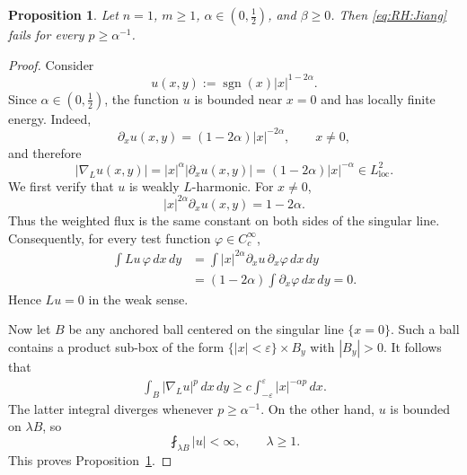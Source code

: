 \documentclass[12pt]{amsart}
\newtheorem{proposition}[theorem]{Proposition}
\begin{document}
\begin{proposition}\label{prop_RH_failure_n1}
Let $n=1$, $m\ge 1$, $\alpha\in (0,\frac{1}{2})$, and $\beta\ge 0$. Then \eqref{eq:RH:Jiang} fails for every $p\ge \alpha^{-1}$.
\end{proposition}

\begin{proof}
Consider
\begin{equation}\label{eq_counterexample_function}
    u(x,y):=\operatorname{sgn}(x)|x|^{1-2\alpha}.
\end{equation}
Since $\alpha \in (0,\frac{1}{2})$, the function $u$ is bounded near $x=0$ and has locally finite energy. Indeed,
\begin{equation*}
\partial_xu(x,y) = (1-2\alpha)|x|^{-2\alpha}, \qquad x\neq0,
\end{equation*}
and therefore
\begin{equation*}
|\nabla_Lu(x,y)| = |x|^\alpha |\partial_x u(x,y)| = (1-2\alpha)|x|^{-\alpha} \in L^2_{\mathrm{loc}}.
\end{equation*}
We first verify that $u$ is weakly $L$-harmonic. For $x\neq0$,
\begin{equation*}
    |x|^{2\alpha}\partial_xu(x,y)
    =
    1-2\alpha.
\end{equation*}
Thus the weighted flux is the same constant on both sides of the singular line. Consequently, for every test function $\varphi\in C_c^\infty$,
\begin{align*}
\int L u \, \varphi \, dx\,dy &= \int |x|^{2\alpha} \partial_x u \, \partial_x \varphi \, dx\,dy\\
&= (1-2\alpha)\int \partial_x\varphi \, dx\,dy = 0.
\end{align*}
Hence $Lu=0$ in the weak sense.

Now let $B$ be any anchored ball centered on the singular line $\{x=0\}$. Such a ball contains a product sub-box of the form $\{|x|<\varepsilon\}\times B_y$ with $|B_y|>0$. It follows that
\begin{align*}
\int_B|\nabla_Lu|^p \, dx\,dy \ge c\int_{-\varepsilon}^{\varepsilon}|x|^{-\alpha p} \, dx.
\end{align*}
The latter integral diverges whenever $p\ge \alpha^{-1}$. On the other hand, $u$ is bounded on $\lambda B$, so
\begin{equation*}
\fint_{\lambda B}|u|<\infty, \qquad \lambda \ge 1.
\end{equation*}
This proves Proposition~\ref{prop_RH_failure_n1}.
\end{proof}
\end{document}
